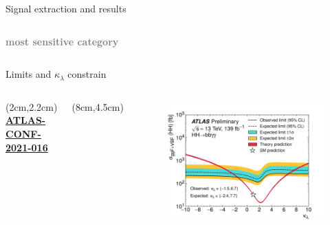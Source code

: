 \begin{frame}{Signal extraction and results}
\begin{columns}
\begin{center}
   \textcolor{gray}{ \textbf{most sensitive category}}
\end{center}

\end{columns}    
\end{frame}


\begin{frame}{Limits and $\kappa_{\lambda}$ constrain}
\begin{columns}

\begin{textblock*}{5cm}(2cm,2.2cm) %
   \textcolor{HHred}{\textbf{\href{https://atlas.web.cern.ch/Atlas/GROUPS/PHYSICS/CONFNOTES/ATLAS-CONF-2021-016}{ATLAS-CONF-2021-016}}}
\end{textblock*}

\begin{textblock*}{6cm}(8cm,4.5cm) %
\end{textblock*}

\begin{figure}
    \centering
    \includegraphics[width=1.1\textwidth]{Part3/Img/limit_yybb.pdf}
\end{figure}



\end{columns}
\end{frame}
